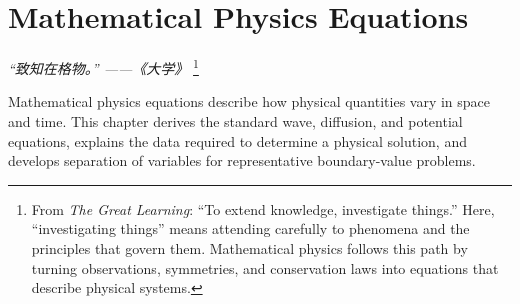 \chapter{Mathematical Physics Equations}
\renewcommand{\currentchapterpath}{chapters/ch04/}

\begin{flushright}
\textit{“致知在格物。” ——《大学》}
\footnote{From \textit{The Great Learning}: 
``To extend knowledge, investigate things.'' Here, ``investigating 
things'' means attending carefully to phenomena and the principles that
 govern them. Mathematical physics follows this path by turning 
 observations, symmetries, and conservation laws into equations 
 that describe physical systems.}
\end{flushright}

Mathematical physics equations describe how physical quantities vary in space and time. This chapter derives the standard wave, diffusion, and potential equations, explains the data required to determine a physical solution, and develops separation of variables for representative boundary-value problems.


